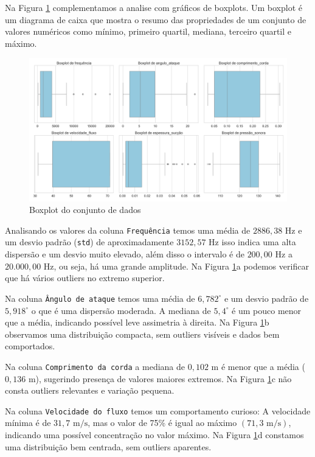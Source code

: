 \documentclass[12pt,a4paper,oneside]{report}
\newcommand{\degree}{^{\circ}}
\newcommand{\fig}[1]{Figura \ref{#1}}
\begin{document}
Na \fig{fig:t1boxplot} complementamos a analise com gráficos de boxplots. Um boxplot é um diagrama de caixa que mostra o resumo das propriedades de um conjunto de valores numéricos como mínimo, primeiro quartil, mediana, terceiro quartil e máximo.
\begin{figure}[th]
	\centering
	\includegraphics[width=0.8\paperwidth]{img/t1_boxplot}
	\caption{Boxplot do conjunto de dados}
	\label{fig:t1boxplot}
\end{figure}

Analisando os valores da coluna \texttt{Frequência} temos uma média de $2886,38 \text{ Hz}$ e um desvio padrão (\texttt{std}) de aproximadamente $3152,57 \text{ Hz}$ isso indica uma alta dispersão e um desvio muito elevado, além disso o intervalo é de  $200,00 \text{ Hz}$ a $20.000,00 \text{ Hz}$, ou seja, há uma grande amplitude. Na \fig{fig:t1boxplot}a podemos verificar que há vários outliers no extremo superior.

Na coluna \texttt{Ângulo de ataque} temos uma média de $6,782\degree$ e um desvio padrão de $5,918\degree$ o que é uma dispersão moderada. A mediana de $5,4\degree$ é um pouco menor que a média, indicando possível leve assimetria à direita.  Na \fig{fig:t1boxplot}b observamos uma distribuição compacta, sem outliers visíveis e dados bem comportados.

Na coluna \texttt{Comprimento da corda} a mediana de $0,102\text{ m}$ é menor que a média ($0,136 \text{ m}$), sugerindo presença de valores maiores extremos. Na \fig{fig:t1boxplot}c não consta outliers relevantes e variação pequena.

Na coluna \texttt{Velocidade do fluxo} temos um comportamento curioso: A velocidade mínima é de $31,7\text{ m/s}$, mas o valor de 75\% é igual ao máximo $(71,3\text{ m/s})$, indicando uma possível concentração no valor máximo. Na \fig{fig:t1boxplot}d constamos uma distribuição bem centrada, sem outliers aparentes.
\end{document}

